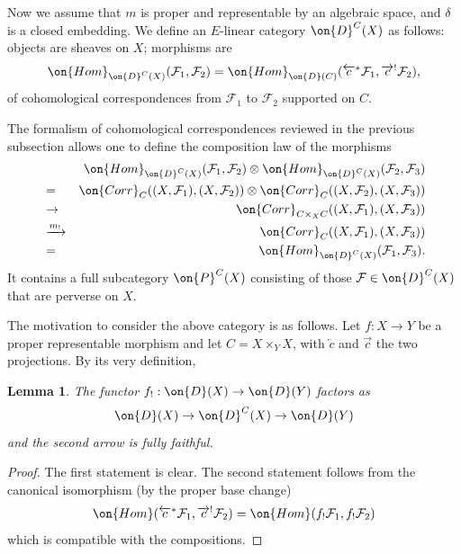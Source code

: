\documentclass[11pt]{amsart}
\newtheorem{lem}[thm]{Lemma}
\theoremstyle{definition}
\theoremstyle{definition}
\theoremstyle{definition}
\numberwithin{equation}{subsection}
\newcommand{\mF}{{\mathcal F}}
\newcommand{\Hom}{{\on{Hom}}}
\begin{document}
Now we assume that $m$ is proper and representable by an algebraic space, and $\delta$ is a closed embedding.
We define an $E$-linear category
$\on{D}^C(X)$ as follows: objects are sheaves on $X$; morphisms are 
\begin{equation}
\label{E:HomDC}
\Hom_{\on{D}^C(X)}(\mF_1,\mF_2)=\Hom_{\on{D}(C)}(\overleftarrow{c}^*\mF_1, \overrightarrow{c}^!\mF_2),
\end{equation}
of cohomological correspondences from $\mF_1$ to $\mF_2$ supported on $C$. 

The formalism of cohomological correspondences reviewed in the previous subsection allows one to define the composition law of the morphisms
\begin{eqnarray*}
&&\Hom_{\on{D}^C(X)}(\mF_1,\mF_2)\otimes\Hom_{\on{D}^C(X)}(\mF_2,\mF_3)\\
&=&\on{Corr}_C((X,\mF_1),(X,\mF_2))\otimes \on{Corr}_C((X,\mF_2),(X,\mF_3))\\
&\to& \on{Corr}_{C\times_XC}((X,\mF_1),(X,\mF_3)) \\
&\xrightarrow{m_!}& \on{Corr}_C((X,\mF_1),(X,\mF_3))\\
&=&\Hom_{\on{D}^C(X)}(\mF_1,\mF_3).
\end{eqnarray*}
It contains a full subcategory $\on{P}^C(X)$ consisting of those $\mF\in\on{D}^C(X)$ that are perverse on $X$.


The motivation to consider the above category is as follows. 
Let $f:X\to Y$ be a proper representable morphism and let $C=X\times_YX$, with $\overleftarrow{c}$ and $\overrightarrow{c}$ the two projections.
By its very definition, 
\begin{lem}
\label{L: fully faithful}
The functor $f_!: \on{D}(X)\to\on{D}(Y)$ factors as
\[\on{D}(X)\to \on{D}^C(X)\to \on{D}(Y)\]
and the second arrow is fully faithful. 
\end{lem}
\begin{proof}
The first statement is clear.
The second statement follows from the canonical isomorphism (by the proper base change)
\[\Hom(\overleftarrow{c}^*\mF_1,\overrightarrow{c}^!\mF_2)=\Hom(f_!\mF_1,f_!\mF_2)\]
which is compatible with the compositions.
\end{proof}
\end{document}
